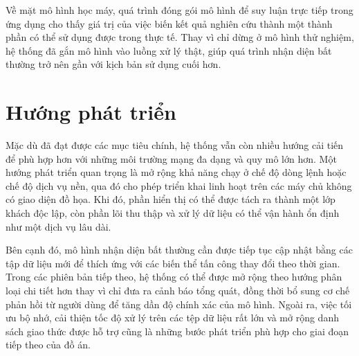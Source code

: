 \documentclass[../DoAn.tex]{subfiles}
\begin{document}
Về mặt mô hình học máy, quá trình đóng gói mô hình để suy luận trực tiếp trong ứng dụng cho thấy giá trị của việc biến kết quả nghiên cứu thành một thành phần có thể sử dụng được trong thực tế. Thay vì chỉ dừng ở mô hình thử nghiệm, hệ thống đã gắn mô hình vào luồng xử lý thật, giúp quá trình nhận diện bất thường trở nên gần với kịch bản sử dụng cuối hơn.

\section{Hướng phát triển}
Mặc dù đã đạt được các mục tiêu chính, hệ thống vẫn còn nhiều hướng cải tiến để phù hợp hơn với những môi trường mạng đa dạng và quy mô lớn hơn. Một hướng phát triển quan trọng là mở rộng khả năng chạy ở chế độ dòng lệnh hoặc chế độ dịch vụ nền, qua đó cho phép triển khai linh hoạt trên các máy chủ không có giao diện đồ họa. Khi đó, phần hiển thị có thể được tách ra thành một lớp khách độc lập, còn phần lõi thu thập và xử lý dữ liệu có thể vận hành ổn định như một dịch vụ lâu dài.

Bên cạnh đó, mô hình nhận diện bất thường cần được tiếp tục cập nhật bằng các tập dữ liệu mới để thích ứng với các biến thể tấn công thay đổi theo thời gian. Trong các phiên bản tiếp theo, hệ thống có thể được mở rộng theo hướng phân loại chi tiết hơn thay vì chỉ đưa ra cảnh báo tổng quát, đồng thời bổ sung cơ chế phản hồi từ người dùng để tăng dần độ chính xác của mô hình. Ngoài ra, việc tối ưu bộ nhớ, cải thiện tốc độ xử lý trên các tệp dữ liệu rất lớn và mở rộng danh sách giao thức được hỗ trợ cũng là những bước phát triển phù hợp cho giai đoạn tiếp theo của đồ án.
\end{document}
